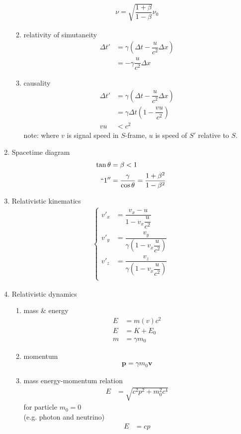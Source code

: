 \documentclass[10.5pt, a4paper, oneside]{article}
\numberwithin{equation}{section}%
\begin{document}
\begin{multicols}{2}
\begin{enumerate}
\begin{enumerate}
\begin{align}
				\nu = \sqrt{\dfrac{1 + \beta}{1 - \beta}}\nu_0
			\end{align}
			\item relativity of simutaneity
			\begin{align}
				\Delta t' &= \gamma (\Delta t - \dfrac{u}{c^2}\Delta x) \nonumber\\
				&= -\gamma\dfrac{u}{c^2}\Delta x
			\end{align}
			\item causality
			\begin{align}
				\Delta t' &= \gamma (\Delta t - \dfrac{u}{c^2}\Delta x) \nonumber\\
				&= \gamma \Delta t (1 - \dfrac{vu}{c^2})\\
				vu &< c^2\nonumber
			\end{align}
			note: where $v$ is signal speed in $S$-frame, $u$ is speed of $S'$ relative to $S$.
		\end{enumerate}
	\item Spacetime diagram
		\begin{align}
			\tan\theta &= \beta < 1\\
			``1'' &= \dfrac{\gamma}{\cos\theta} = \dfrac{1 + \beta^2}{1 - \beta^2}
		\end{align}
	\item Relativistic kinematics
		\begin{align}
			\left\{\begin{aligned}
			v'_x &= \dfrac{v_x - u}{1 - v_x\dfrac{u}{c^2}}\\
			v'_y &= \dfrac{v_y}{\gamma(1 - v_x\dfrac{u}{c^2})}\\
			v'_z &= \dfrac{v_z}{\gamma(1 - v_x\dfrac{u}{c^2})}\\
			\end{aligned}\right.
		\end{align}
	\item Relativistic dynamics
		\begin{enumerate}
			\item mass \& energy
				\begin{align}
					E &= m(v)c^2\\
					E &= K + E_0\\
					m &= \gamma m_0
				\end{align}
			\item momentum
				\begin{align}
					\bm{p} = \gamma m_0 \bm{v}
				\end{align}
			\item mass energy-momentum relation
				\begin{align}
					E &= \sqrt{c^2 p^2 + m_0^2 c^4}
				\end{align}
				for particle $m_0 = 0$\\
				(e.g. photon and neutrino)
				\begin{align}
					E &= cp
				\end{align}
		\end{enumerate}
\end{enumerate}

\end{multicols}
\end{document}
